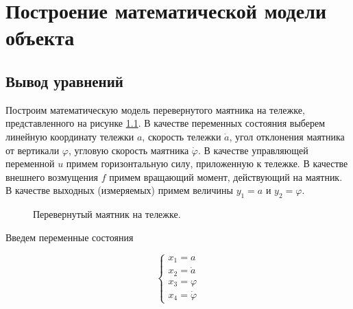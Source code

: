 \chapter{Построение математической модели объекта}
\label{ch:chap1}

\section{Вывод уравнений}

Построим математическую модель перевернутого маятника на тележке, представленного на рисунке \ref{1_pic_may}. В качестве переменных состояния выберем линейную координату тележки $a$, скорость тележки $\dot{a}$, угол отклонения маятника от вертикали $\varphi$, угловую скорость маятника $\dot{\varphi}$. В качестве управляющей переменной $u$ примем горизонтальную силу, приложенную к тележке. В качестве внешнего возмущения $f$ примем вращающий момент, действующий на маятник. В качестве выходных (измеряемых) примем величины $y_1 = a$ и $y_2 = \varphi$.

\begin{figure}[h]
\caption{Перевернутый маятник на тележке.}
\label{1_pic_may}
\end{figure}

Введем переменные состояния

\begin{equation}
    \begin{cases}
        x_1 = a\\
        x_2 = \dot{a}\\
        x_3 = \varphi \\
        x_4 = \dot{ \varphi}
    \end{cases}
\end{equation}

